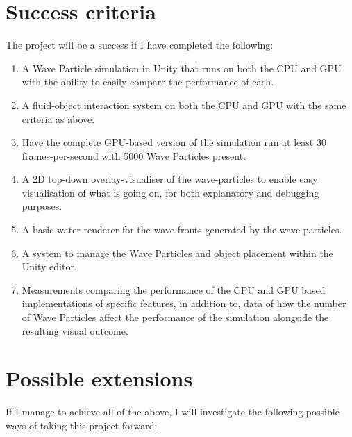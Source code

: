 \section*{Success criteria}

The project will be a success if I have completed the following:

\begin{enumerate}

\item A Wave Particle simulation in Unity that runs on both the CPU and GPU with
the ability to easily compare the performance of each.

\item A fluid-object interaction system on both the CPU and GPU with the same
criteria as above.

\item Have the complete GPU-based version of the simulation run at least 30
frames-per-second with 5000 Wave Particles present.

\item A 2D top-down overlay-visualiser of the wave-particles to enable easy
visualisation of what is going on, for both explanatory and debugging purposes.

\item A basic water renderer for the wave fronts generated by the wave
particles.

\item A system to manage the Wave Particles and object placement within the
Unity editor.

\item Measurements comparing the performance of the CPU and GPU based
implementations of specific features, in addition to, data of how the number of
Wave Particles affect the performance of the simulation alongside the resulting
visual outcome.

\end{enumerate}

\section*{Possible extensions}

If I manage to achieve all of the above, I will investigate the following
possible ways of taking this project forward:

